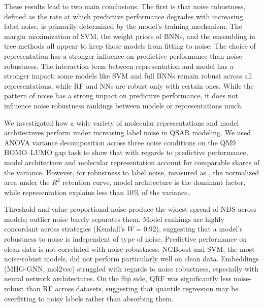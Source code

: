 
These results lead to two main conclusions. The first is that noise robustness, defined as the rate at which predictive performance degrades with increasing label noise, is primarily determined by the model's training mechanism. The margin maximization of SVM, the weight priors of BNNs, and the ensembling in tree methods all appear to keep those models from fitting to noise. The choice of representation has a stronger influence on predictive performance than noise robustness. The interaction term between representation and model has a stronger impact; some models like SVM and full BNNs remain robust across all representations, while RF and NNs are robust only with certain ones. While the pattern of noise has a strong impact on predictive performance, it does not influence noise robustness rankings between models or representations much.

We investigated how a wide variety of molecular representations and model architectures perform under increasing label noise in QSAR modeling. We used ANOVA variance decomposition across three noise conditions on the QM9 HOMO--LUMO gap task to show that with regards to predictive performance, model architecture and molecular representation account for comparable shares of the variance. However, for robustness to label noise, measured as \aucnorm, the normalized area under the $R^2$ retention curve, model architecture is the dominant factor, while representation explains less than 10\% of the variance.

Threshold and value-proportional noise produce the widest spread of NDS across models; outlier noise barely separates them. Model rankings are highly concordant across strategies (Kendall's $W = 0.92$), suggesting that a model's robustness to noise is independent of type of noise. Predictive performance on clean data is not correlated with noise robustness; NGBoost and SVM, the most noise-robust models, did not perform particularly well on clean data. Embeddings (MHG-GNN, mol2vec) struggled with regards to noise robustness, especially with neural network architectures. On the flip side, QRF was significantly less noise-robust than RF across datasets, suggesting that quantile regression may be overfitting to noisy labels rather than absorbing them.

